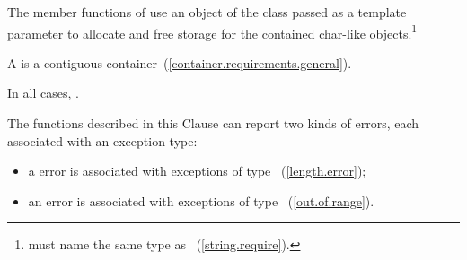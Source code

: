 \pnum
The
member functions of
 use an object of the
class passed as a template parameter to allocate and free storage for the
contained char-like objects.\footnote{ must name the same type
as ~(\ref{string.require}).}

\pnum
A  is a contiguous container~(\ref{container.requirements.general}).

\pnum
In all cases,
.

\pnum
The functions described in this Clause can report two
kinds of errors, each associated with an exception type:

\begin{itemize}
\item
a
error is associated with exceptions of type
~(\ref{length.error});
%
\item
an
error is associated with exceptions of type
~(\ref{out.of.range}).
%
\end{itemize}

